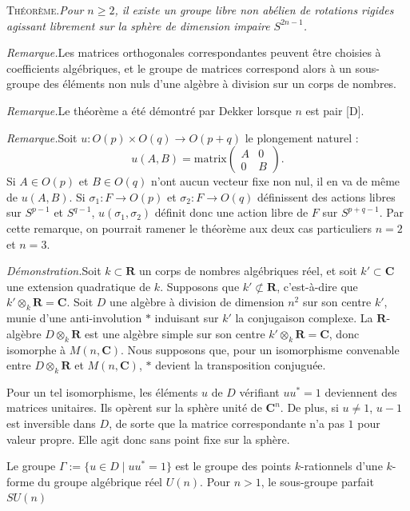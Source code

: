 \documentclass[10pt,a4paper]{article}
\newcommand{\TheoremBlock}[1]{\par\vspace{0.7em}\noindent\hspace{1.4em}\textsc{Théorème.}\quad\textit{#1}\par}
\newcommand{\RemarkBlock}[1]{\par\vspace{0.55em}\noindent\hspace{1.4em}\textit{Remarque.}\quad #1\par}
\begin{document}
\TheoremBlock{Pour $n\geq 2$, il existe un groupe libre non abélien de rotations rigides
agissant librement sur la sphère de dimension impaire $S^{2n-1}$.}

\RemarkBlock{Les matrices orthogonales correspondantes peuvent être choisies à
coefficients algébriques, et le groupe de matrices correspond alors à un sous-groupe des
éléments non nuls d'une algèbre à division sur un corps de nombres.}

\RemarkBlock{Le théorème a été démontré par Dekker lorsque $n$ est pair [D].}

\RemarkBlock{Soit $u:O(p)\times O(q)\to O(p+q)$ le plongement naturel :
\[
u(A,B)=\text{matrix}\begin{pmatrix}A&0\\0&B\end{pmatrix}.
\]
Si $A\in O(p)$ et $B\in O(q)$ n'ont aucun vecteur fixe non nul, il en va de même de
$u(A,B)$. Si $\sigma_1:F\to O(p)$ et $\sigma_2:F\to O(q)$ définissent des actions libres sur $S^{p-1}$ et
$S^{q-1}$, $u(\sigma_1,\sigma_2)$ définit donc une action libre de $F$ sur $S^{p+q-1}$. Par cette remarque,
on pourrait ramener le théorème aux deux cas particuliers $n=2$ et $n=3$.}

\par\vspace{0.55em}\noindent\hspace{1.4em}\textit{Démonstration.}\quad Soit $k\subset\mathbf{R}$ un corps de nombres algébriques réel, et soit $k'\subset\mathbf{C}$ une extension quadratique de $k$. Supposons que $k'\not\subset\mathbf{R}$, c'est-à-dire que $k'\otimes_k\mathbf{R}=\mathbf{C}$. Soit $D$ une
algèbre à division de dimension $n^2$ sur son centre $k'$, munie d'une anti-involution
$*$ induisant sur $k'$ la conjugaison complexe. La $\mathbf{R}$-algèbre $D\otimes_k\mathbf{R}$ est
une algèbre simple sur son centre $k'\otimes_k\mathbf{R}=\mathbf{C}$, donc isomorphe à $M(n,\mathbf{C})$.
Nous supposons que, pour un isomorphisme convenable entre $D\otimes_k\mathbf{R}$ et $M(n,\mathbf{C})$, $*$
devient la transposition conjuguée.

Pour un tel isomorphisme, les éléments $u$ de $D$ vérifiant $uu^*=1$ deviennent
des matrices unitaires. Ils opèrent sur la sphère unité de $\mathbf{C}^n$. De plus,
si $u\neq1$, $u-1$ est inversible dans $D$, de sorte que la matrice correspondante n'a pas
$1$ pour valeur propre. Elle agit donc sans point fixe sur la sphère.

Le groupe $\Gamma:=\{u\in D\mid uu^*=1\}$ est le groupe des points $k$-rationnels d'une
$k$-forme du groupe algébrique réel $U(n)$. Pour $n>1$, le sous-groupe parfait $SU(n)$
\end{document}
